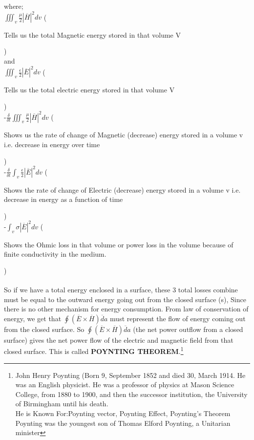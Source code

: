 where;
\\
$ \iiint_{v}\frac{\mu}{2}|\overline{H}|^{2}dv $ (\begin{small}
Tells us the total Magnetic energy stored in that volume V
\end{small})\\
and\\
$ \iiint_{v} \frac{\epsilon}{2}|\overline{E}|^{2}dv $ (\begin{small}
	Tells us the total electric energy stored in that volume V     
\end{small})\\
-$\frac{\delta}{\delta t}\iiint_{v}\frac{\mu}{2}|\overline{H}|^{2}dv$
(\begin{small}
	Shows us the rate of change of Magnetic (decrease) energy stored                            in a volume v i.e. decrease in energy over time     
\end{small})\\
-$\frac{\delta}{\delta t}\int_{v}\frac{\epsilon}{2}|\overline{E}|^{2}dv$
(\begin{small}
	Shows the rate of change of Electric (decrease) energy stored                            in a volume v i.e. decrease in energy as a function of time    
\end{small})\\ 
-$\int_{v}\sigma|\overline{E}|^{2}dv$
(\begin{small}
	Shows the Ohmic loss in that volume or power loss in the volume because of finite conductivity in the medium.   
\end{small})\\ \\
So if we have a total energy enclosed in a surface, these 3 total losses combine must be equal to the outward energy going out from the closed surface (s), Since there is no other mechanism for energy consumption. From law of conservation of energy, we get that $ \oint(\overline{E}\times\overline{H})\overline{d}a $ must represent the flow of energy coming out from the closed surface. So $ \oint(\overline{E}\times\overline{H})\overline{d}a $ (the net power outflow from a closed surface)  gives the net power flow of the electric and magnetic field from that closed surface. This is called \textbf{ POYNTING THEOREM}.\footnote{John Henry Poynting (Born 9, September 1852 and died 30, March 1914. He was an English physicist. He was a professor of physics at Mason Science College, from 1880 to 1900, and then the successor institution, the University of Birmingham until his death.\\ 
	He is Known For:Poynting vector, Poynting Effect, Poynting's Theorem \\
	Poynting was the youngest son of Thomas Elford Poynting, a Unitarian minister}
